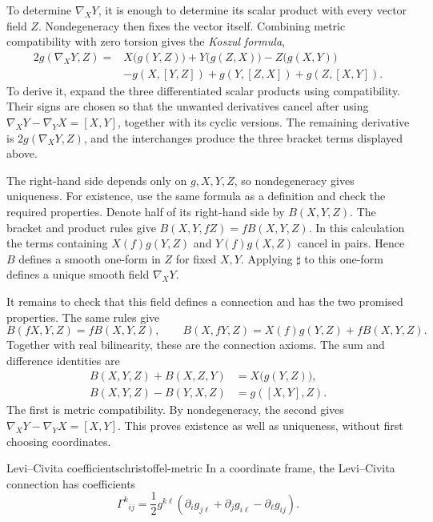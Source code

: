 \documentclass[11pt,a4paper]{article}
\numberwithin{equation}{section}
\begin{document}
To determine \(\nabla_XY\), it is enough to determine its scalar
product with every vector field \(Z\). Nondegeneracy then fixes the
vector itself. Combining metric compatibility with zero torsion gives
the \emph{Koszul formula},
\begin{equation}
 \label{eq:koszul}
 \begin{aligned}
 2g(\nabla_XY,Z)
 ={}&X\bigl(g(Y,Z)\bigr)+Y\bigl(g(Z,X)\bigr)-Z\bigl(g(X,Y)\bigr)\\
    &-g(X,[Y,Z])+g(Y,[Z,X])+g(Z,[X,Y]).
 \end{aligned}
\end{equation}
To derive it, expand the three differentiated scalar products using
compatibility. Their signs are chosen so that the unwanted derivatives
cancel after using \(\nabla_XY-\nabla_YX=[X,Y]\), together with its
cyclic versions. The remaining derivative is
\(2g(\nabla_XY,Z)\), and the interchanges produce the three bracket
terms displayed above.

The right-hand side depends only on \(g,X,Y,Z\), so nondegeneracy gives
uniqueness. For existence, use the same formula as a definition and
check the required properties. Denote half of its right-hand side by
\(B(X,Y,Z)\). The bracket and product rules give
\(B(X,Y,fZ)=fB(X,Y,Z)\). In this calculation the terms containing
\(X(f)g(Y,Z)\) and \(Y(f)g(X,Z)\) cancel in pairs. Hence \(B\) defines a
smooth one-form in \(Z\) for fixed \(X,Y\). Applying \(\sharp\) to
this one-form defines a unique smooth field \(\nabla_XY\).

It remains to check that this field defines a connection and has the two
promised properties. The same rules give
\[
 B(fX,Y,Z)=fB(X,Y,Z),\qquad
 B(X,fY,Z)=X(f)g(Y,Z)+fB(X,Y,Z).
\]
Together with real bilinearity, these are the connection axioms.
The sum and difference identities are
\[
 \begin{aligned}
 B(X,Y,Z)+B(X,Z,Y)&=X\bigl(g(Y,Z)\bigr),\\
 B(X,Y,Z)-B(Y,X,Z)&=g([X,Y],Z).
 \end{aligned}
\]
The first is metric compatibility. By nondegeneracy, the second gives
\(\nabla_XY-\nabla_YX=[X,Y]\). This proves existence as well as uniqueness,
without first choosing coordinates.

\begin{proposition}{Levi--Civita coefficients}{christoffel-metric}
In a coordinate frame, the Levi--Civita connection has coefficients
\begin{equation}
 \label{eq:christoffel-metric}
 \Gamma^k{}_{ij}
 =\frac12g^{k\ell}
 \left(\partial_i g_{j\ell}+\partial_j g_{i\ell}
       -\partial_\ell g_{ij}\right).
\end{equation}
\end{proposition}
\end{document}
